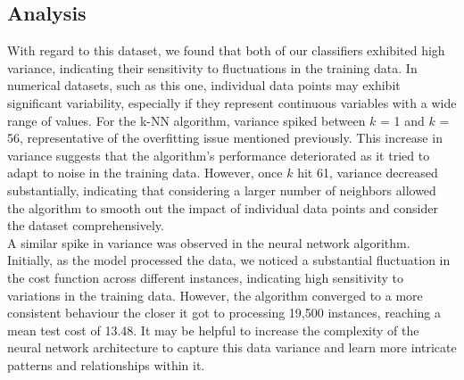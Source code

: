\documentclass{article}
\begin{document}
\subsection*{Analysis}
With regard to this dataset, we found that both of our classifiers exhibited high variance, 
indicating their sensitivity to fluctuations in the training data.
In numerical datasets, such as this one, individual data points may exhibit significant variability, 
especially if they represent continuous variables with a wide range of values.
For the k-NN algorithm, variance spiked between $k$ = 1 and $k$ = 56,
representative of the overfitting issue mentioned previously.
This increase in variance suggests that the algorithm's performance deteriorated
as it tried to adapt to noise in the training data.
However, once $k$ hit 61, variance decreased substantially, 
indicating that considering a larger number of neighbors allowed the algorithm 
to smooth out the impact of individual data points and consider the dataset comprehensively.
\\

A similar spike in variance was observed in the neural network algorithm. 
Initially, as the model processed the data, 
we noticed a substantial fluctuation in the cost function across different instances, 
indicating high sensitivity to variations in the training data. 
However, the algorithm converged to a more consistent behaviour the closer it got to processing 19,500 instances,
reaching a mean test cost of 13.48.
It may be helpful to increase the complexity of the neural network architecture to capture this data variance
and learn more intricate patterns and relationships within it.
\end{document}
